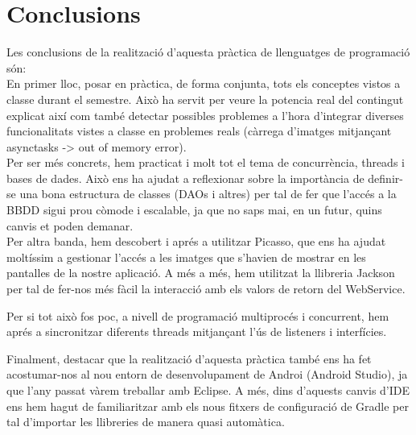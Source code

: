 \documentclass{article}
\begin{document}
\newpage
\section{Conclusions}
Les conclusions de la realització d'aquesta pràctica de llenguatges de programació són:\\

En primer lloc, posar en pràctica, de forma conjunta, tots els conceptes vistos a classe durant el semestre. Això ha servit per veure la potencia real del contingut explicat així com també detectar possibles problemes a l'hora d'integrar diverses funcionalitats vistes a classe en problemes reals (càrrega d'imatges mitjançant asynctasks -> out of memory error).\\

Per ser més concrets, hem practicat i molt tot el tema de concurrència, threads i bases de dades. Això ens ha ajudat a reflexionar sobre la importància de definir-se una bona estructura de classes (DAOs i altres) per tal de fer que l'accés a la BBDD sigui prou còmode i escalable, ja que no saps mai, en un futur, quins canvis et poden demanar.\\

Per altra banda, hem descobert i aprés a utilitzar Picasso, que ens ha ajudat moltíssim a gestionar l'accés a les imatges que s'havien de mostrar en les pantalles de la nostre aplicació.  A més a més, hem utilitzat la llibreria Jackson per tal de fer-nos més fàcil la interacció amb els valors de retorn del WebService. 

Per si tot això fos poc, a nivell de programació multiprocés i concurrent, hem aprés a sincronitzar diferents threads mitjançant l'ús de listeners i interfícies.

Finalment, destacar que la realització d'aquesta pràctica també ens ha fet acostumar-nos al nou entorn de desenvolupament de Androi (Android Studio), ja que l'any passat vàrem treballar amb Eclipse. A més, dins d'aquests canvis d'IDE ens hem hagut de familiaritzar amb els nous fitxers de configuració de Gradle per tal d'importar les llibreries de manera quasi automàtica.
\end{document}
